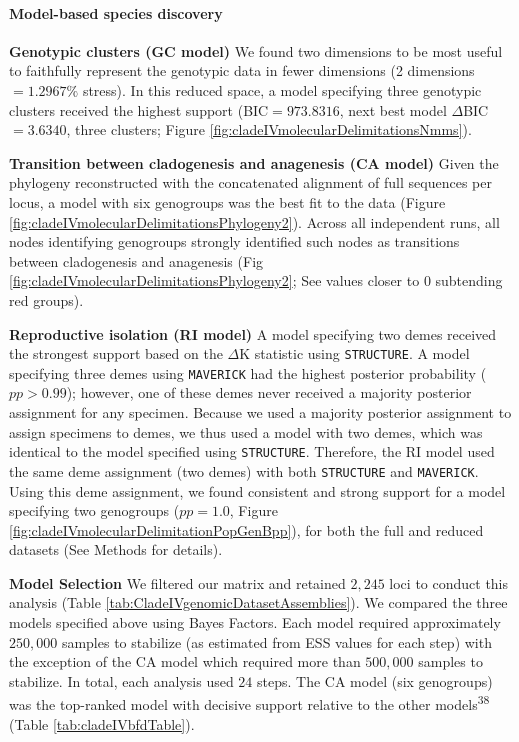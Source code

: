 \documentclass[
  11pt,
]{article}
\begin{document}
\hypertarget{model-based-species-discovery-7}{%
\paragraph{Model-based species discovery}\label{model-based-species-discovery-7}}

\textbf{Genotypic clusters (GC model)} We found two dimensions to be most useful to faithfully represent the genotypic data in fewer dimensions (2 dimensions \(= 1.2967\%\) stress). In this reduced space, a model specifying three genotypic clusters received the highest support (BIC\(=973.8316\), next best model \(\Delta\)BIC\(=3.6340\), three clusters; Figure \ref{fig:cladeIVmolecularDelimitationsNmms}).

\textbf{Transition between cladogenesis and anagenesis (CA model)} Given the phylogeny reconstructed with the concatenated alignment of full sequences per locus, a model with six genogroups was the best fit to the data (Figure \ref{fig:cladeIVmolecularDelimitationsPhylogeny2}). Across all independent runs, all nodes identifying genogroups strongly identified such nodes as transitions between cladogenesis and anagenesis (Fig \ref{fig:cladeIVmolecularDelimitationsPhylogeny2}; See values closer to \(0\) subtending red groups).

\textbf{Reproductive isolation (RI model)} A model specifying two demes received the strongest support based on the \(\Delta\)K statistic using \texttt{STRUCTURE}. A model specifying three demes using \texttt{MAVERICK} had the highest posterior probability (\(pp>0.99\)); however, one of these demes never received a majority posterior assignment for any specimen. Because we used a majority posterior assignment to assign specimens to demes, we thus used a model with two demes, which was identical to the model specified using \texttt{STRUCTURE}. Therefore, the RI model used the same deme assignment (two demes) with both \texttt{STRUCTURE} and \texttt{MAVERICK}. Using this deme assignment, we found consistent and strong support for a model specifying two genogroups (\(pp=1.0\), Figure \ref{fig:cladeIVmolecularDelimitationPopGenBpp}), for both the full and reduced datasets (See Methods for details).

\textbf{Model Selection} We filtered our matrix and retained \(2,245\) loci to conduct this analysis (Table \ref{tab:CladeIVgenomicDatasetAssemblies}). We compared the three models specified above using Bayes Factors. Each model required approximately \(250,000\) samples to stabilize (as estimated from ESS values for each step) with the exception of the CA model which required more than \(500,000\) samples to stabilize. In total, each analysis used \(24\) steps. The CA model (six genogroups) was the top-ranked model with decisive support relative to the other models\textsuperscript{38} (Table \ref{tab:cladeIVbfdTable}).
\end{document}
